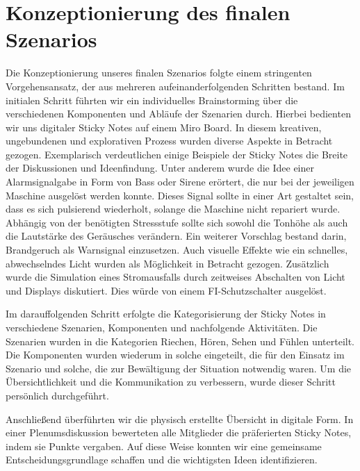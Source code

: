 \newpage
\section{Konzeptionierung des finalen Szenarios}

Die Konzeptionierung unseres finalen Szenarios folgte einem stringenten Vorgehensansatz, der aus mehreren aufeinanderfolgenden Schritten bestand. Im initialen Schritt führten wir ein individuelles Brainstorming über die verschiedenen Komponenten und Abläufe der Szenarien durch. Hierbei bedienten wir uns digitaler \glqq Sticky Notes\grqq{} auf einem Miro Board. In diesem kreativen, ungebundenen und explorativen Prozess wurden diverse Aspekte in Betracht gezogen. Exemplarisch verdeutlichen einige Beispiele der \glqq Sticky Notes\grqq{} die Breite der Diskussionen und Ideenfindung. Unter anderem wurde die Idee einer Alarmsignalgabe in Form von Bass oder Sirene erörtert, die nur bei der jeweiligen Maschine ausgelöst werden konnte. Dieses Signal sollte in einer Art gestaltet sein, dass es sich pulsierend wiederholt, solange die Maschine nicht repariert wurde. Abhängig von der benötigten Stressstufe sollte sich sowohl die Tonhöhe als auch die Lautstärke des Geräusches verändern. Ein weiterer Vorschlag bestand darin, Brandgeruch als Warnsignal einzusetzen. Auch visuelle Effekte wie ein schnelles, abwechselndes Licht wurden als Möglichkeit in Betracht gezogen. Zusätzlich wurde die Simulation eines Stromausfalls durch zeitweises Abschalten von Licht und Displays diskutiert. Dies würde von einem FI-Schutzschalter ausgelöst.

Im darauffolgenden Schritt erfolgte die Kategorisierung der \glqq Sticky Notes\grqq{} in verschiedene Szenarien, Komponenten und nachfolgende Aktivitäten. Die Szenarien wurden in die Kategorien \glqq Riechen\grqq{}, \glqq Hören\grqq{}, \glqq Sehen\grqq{} und \glqq Fühlen\grqq{} unterteilt. Die Komponenten wurden wiederum in solche eingeteilt, die für den Einsatz im Szenario und solche, die zur Bewältigung der Situation notwendig waren. Um die Übersichtlichkeit und die Kommunikation zu verbessern, wurde dieser Schritt persönlich durchgeführt.

Anschließend überführten wir die physisch erstellte Übersicht in digitale Form. In einer Plenumsdiskussion bewerteten alle Mitglieder die präferierten \glqq Sticky Notes\grqq{}, indem sie Punkte vergaben. Auf diese Weise konnten wir eine gemeinsame Entscheidungsgrundlage schaffen und die wichtigsten Ideen identifizieren.

